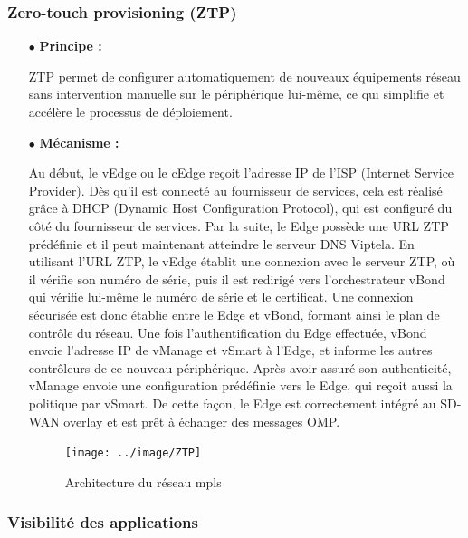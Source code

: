 \subsubsection{Zero-touch provisioning (ZTP)   }
\begin{itemize}
	\item[$\bullet$]\textbf{  Principe :} 
	
ZTP permet de configurer automatiquement de nouveaux équipements réseau sans intervention manuelle sur le périphérique lui-même, ce qui  simplifie et accélère le processus de déploiement.
\end{itemize}
\begin{itemize}
	\item[$\bullet$]\textbf{Mécanisme :} 
	
	Au début, le vEdge ou le cEdge reçoit l'adresse IP de l'ISP (Internet Service Provider). Dès qu'il est connecté au fournisseur de services, cela est réalisé grâce à DHCP (Dynamic Host Configuration Protocol), qui est configuré du côté du fournisseur de services. Par la suite, le Edge possède une URL ZTP prédéfinie et il peut maintenant atteindre le serveur DNS Viptela. En utilisant l'URL ZTP, le vEdge établit une connexion avec le serveur ZTP, où il vérifie son numéro de série, puis il est redirigé vers l'orchestrateur vBond qui vérifie lui-même le numéro de série et le certificat. Une connexion sécurisée est donc établie entre le Edge et vBond, formant ainsi le plan de contrôle du réseau. Une fois l'authentification du Edge effectuée, vBond envoie l'adresse IP de vManage et vSmart à l'Edge, et informe les autres contrôleurs de ce nouveau périphérique. Après avoir assuré son authenticité, vManage envoie une configuration prédéfinie vers le Edge, qui reçoit aussi la politique par vSmart. De cette façon, le Edge est correctement intégré au SD-WAN overlay et est prêt à échanger des messages OMP.
	
	\begin{figure} [H]
		\begin{center}
			\centering
			\hspace*{-0.5cm}
		\texttt{[image: ../image/ZTP]}
		\end{center}
		\caption{Architecture du réseau mpls}
	\end{figure} 
	
\end{itemize}
\subsubsection{Visibilité des applications  }

